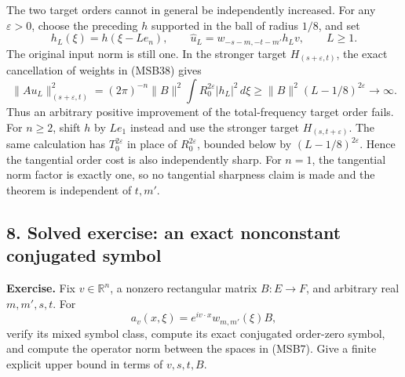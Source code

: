 \documentclass[
  11pt,
]{article}
\makeatletter
\let\ReaderOriginalAnchorStart\hyper@anchorstart
\let\ReaderOriginalAnchorEnd\hyper@anchorend
\let\ReaderPendingAliases\@empty
\def\ReaderArmAliases#1{\gdef\ReaderPendingAliases{#1}}
\def\hyper@anchorstart#1{\ReaderIfNativeAnchorTF{#1}{\ReaderPendingAliases\global\let\ReaderPendingAliases\@empty}{}\ReaderOriginalAnchorStart{#1}}
\makeatother
\begin{document}
The two target orders cannot in general be independently increased. For
any \(\varepsilon>0\), choose the preceding \(h\) supported in the ball
of radius \(1/8\), and set \[
 h_L(\xi)=h(\xi-Le_n),\qquad
 \widehat u_L=w_{-s-m,-t-m'}h_Lv,\qquad L\geq1.
\] The original input norm is still one. In the stronger target
\(H_{(s+\varepsilon,t)}\), the exact cancellation of weights in (MSB38)
gives \[
 \|Au_L\|_{(s+\varepsilon,t)}^2
 =(2\pi)^{-n}\|B\|^2\int R_0^{2\varepsilon}|h_L|^2\,d\xi
 \geq\|B\|^2(L-1/8)^{2\varepsilon}\longrightarrow\infty.
 \tag{MSB39}
\] Thus an arbitrary positive improvement of the total-frequency target
order fails. For \(n\geq2\), shift \(h\) by \(Le_1\) instead and use the
stronger target \(H_{(s,t+\varepsilon)}\). The same calculation has
\(T_0^{2\varepsilon}\) in place of \(R_0^{2\varepsilon}\), bounded below
by \((L-1/8)^{2\varepsilon}\). Hence the tangential order cost is also
independently sharp. For \(n=1\), the tangential norm factor is exactly
one, so no tangential sharpness claim is made and the theorem is
independent of \(t,m'\).

\ReaderArmAliases{\ReaderOriginalAnchorStart{AN03-MSB-008}\ReaderOriginalAnchorEnd\begingroup\expandafter\def\csname @currentHref\endcsname{AN03-MSB-008}\label{AN03-MSB-008}\endgroup\ReaderOriginalAnchorStart{an03-msb-008-solved-exercise-an-exact-nonconstant-conjugated-symbol}\ReaderOriginalAnchorEnd\begingroup\expandafter\def\csname @currentHref\endcsname{an03-msb-008-solved-exercise-an-exact-nonconstant-conjugated-symbol}\label{an03-msb-008-solved-exercise-an-exact-nonconstant-conjugated-symbol}\endgroup\ReaderOriginalAnchorStart{8-solved-exercise-an-exact-nonconstant-conjugated-symbol}\ReaderOriginalAnchorEnd\begingroup\expandafter\def\csname @currentHref\endcsname{8-solved-exercise-an-exact-nonconstant-conjugated-symbol}\label{8-solved-exercise-an-exact-nonconstant-conjugated-symbol}\endgroup}
\subsection{8. Solved exercise: an exact nonconstant conjugated
symbol}\label{solved-exercise-an-exact-nonconstant-conjugated-symbol}

\textbf{Exercise.} Fix \(v\in\mathbb R^n\), a nonzero rectangular matrix
\(B:E\to F\), and arbitrary real \(m,m',s,t\). For \[
 a_v(x,\xi)=e^{iv\cdot x}w_{m,m'}(\xi)B,
\] verify its mixed symbol class, compute its exact conjugated
order-zero symbol, and compute the operator norm between the spaces in
(MSB7). Give a finite explicit upper bound in terms of \(v,s,t,B\).
\end{document}
